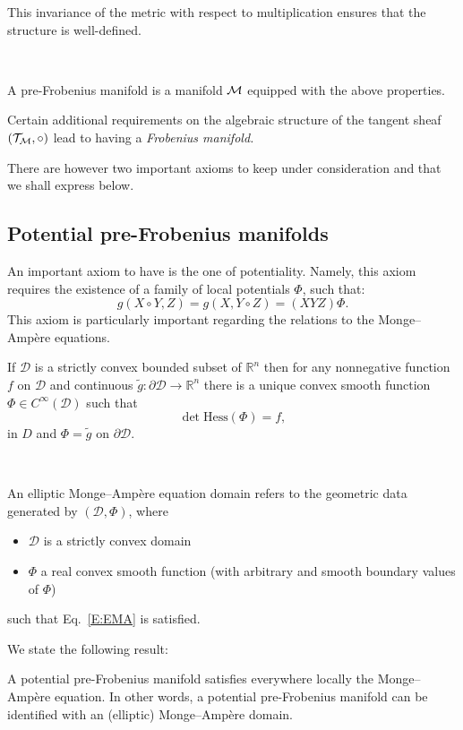 This invariance of the metric with respect to multiplication ensures that the structure is well-defined.

\, 

\begin{definition}
    A pre-Frobenius manifold is a manifold $\mathcal{M}$ equipped with the above  properties.
\end{definition}

Certain additional requirements on the algebraic structure of the tangent sheaf $(\mathcal{T}_{\mathcal{M}}, \circ)$ lead to having a \emph{Frobenius manifold.} 
\, 

There are however two important axioms to keep under consideration and that we shall express below. 

\subsection{Potential pre-Frobenius manifolds}

An important axiom to have is the one of potentiality. Namely, this axiom requires the existence of a family of local potentials $\Phi$, such that:
\[
g(X \circ Y, Z) = g(X, Y \circ Z) = (XYZ) \Phi.
\]
This axiom is particularly important regarding the relations to the Monge--Ampère equations.


If $ \mathscr{D}$ is a strictly convex bounded subset of $\mathbb{R}^n$ then for any nonnegative function $f$ on $\mathscr{D}$ and continuous $\tilde{g}:\partial  \mathscr{D} \to \mathbb{R}^n$ there is a unique convex smooth function $\Phi\in C^{\infty}( \mathscr{D})$ such that 
\begin{equation}\label{E:EMA}
\det \mathrm{Hess}(\Phi)= f, 
\end{equation} in $D$ and $\Phi=\tilde{g}$ on $\partial \mathscr{D}$.

\, 

An elliptic Monge--Ampère equation domain refers to the geometric data generated by $(\mathscr{D}, \Phi)$, where \begin{itemize}
    \item $\mathscr{D}$ is a strictly convex domain 
    \item $\Phi$ a real convex smooth function (with arbitrary and smooth boundary values of $\Phi$)  
    \end{itemize}
    such that Eq.~\eqref{E:EMA} is satisfied.  


We state the following result: 
\begin{theorem}
  A potential pre-Frobenius manifold satisfies everywhere locally the Monge--Amp\`ere equation. In other words, a potential pre-Frobenius manifold can be identified with an (elliptic) Monge--Amp\`ere domain.
\end{theorem}

